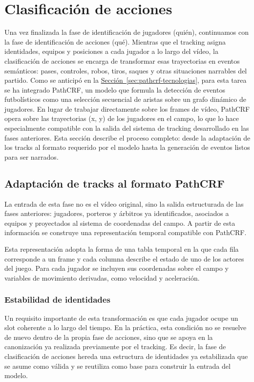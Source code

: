 \section{Clasificación de acciones}
\label{sec:clasificacion-acciones}

Una vez finalizada la fase de identificación de jugadores (quién), continuamos con la
fase de identificación de acciones (qué). Mientras que el tracking asigna identidades,
equipos y posiciones a cada jugador a lo largo del vídeo, la clasificación de acciones
se encarga de transformar esas trayectorias en eventos semánticos: pases, controles,
robos, tiros, saques y otras situaciones narrables del partido. Como se anticipó en la \hyperref[sec:pathcrf-tecnologias]{Sección~\ref*{sec:pathcrf-tecnologias}}, para esta tarea se ha integrado PathCRF, un modelo que formula la detección de eventos futbolísticos como una selección secuencial de aristas sobre un grafo dinámico de jugadores. En lugar de trabajar directamente sobre los frames de vídeo, PathCRF opera sobre las trayectorias (x, y) de los jugadores en el campo, lo que lo hace especialmente compatible con la salida del sistema de tracking desarrollado en las fases anteriores. Esta sección describe el proceso completo: desde la adaptación de los tracks al formato requerido por el modelo hasta la generación de eventos listos para ser narrados.


\subsection{Adaptación de tracks al formato PathCRF}
La entrada de esta fase no es el vídeo original, sino la salida estructurada de las fases anteriores: jugadores, porteros y árbitros ya identificados, asociados a equipos y proyectados al sistema de coordenadas del campo. A partir de esta información se construye una representación temporal compatible con PathCRF.

Esta representación adopta la forma de una tabla temporal en la que cada fila corresponde a un frame y cada columna describe el estado de uno de los actores del juego. Para cada jugador se incluyen sus coordenadas sobre el campo y variables de movimiento derivadas, como velocidad y aceleración. 

\subsubsection{Estabilidad de identidades}

Un requisito importante de esta transformación es que cada jugador ocupe un slot coherente a lo largo del tiempo. En la práctica, esta condición no se resuelve de nuevo dentro de la propia fase de acciones, sino que se apoya en la canonización ya realizada previamente por el tracking. Es decir, la fase de clasificación de acciones hereda una estructura de identidades ya estabilizada que se asume como válida y se reutiliza como base para construir la entrada del modelo.

